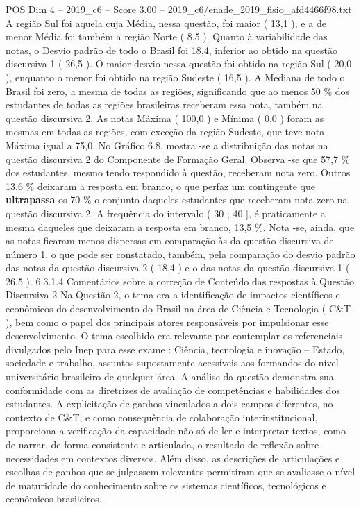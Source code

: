 \begin{textsample}{POS Dim 4 – 2019\_c6 – Score 3.00 – 2019\_c6/enade\_2019\_fisio\_afd4466f98.txt}
A região Sul foi aquela cuja Média, nessa questão, foi maior ( 13,1 ), e a de menor Média foi também a região Norte ( 8,5 ).
Quanto à variabilidade das notas, o Desvio padrão de todo o Brasil foi 18,4, inferior ao obtido na questão discursiva 1 ( 26,5 ).
O maior desvio nessa questão foi obtido na região Sul ( 20,0 ), enquanto o menor foi obtido na região Sudeste ( 16,5 ).
A Mediana de todo o Brasil foi zero, a mesma de todas as regiões, significando que ao menos 50 \% dos estudantes de todas as regiões brasileiras receberam essa nota, também na questão discursiva 2.
As notas Máxima ( 100,0 ) e Mínima ( 0,0 ) foram as mesmas em todas as regiões, com exceção da região Sudeste, que teve nota Máxima igual a 75,0.
No Gráfico 6.8, mostra -se a distribuição das notas na questão discursiva 2 do Componente de Formação Geral.
Observa -se que 57,7 \% dos estudantes, mesmo tendo respondido à questão, receberam nota zero.
Outros 13,6 \% deixaram a resposta em branco, o que perfaz um contingente que \textbf{ultrapassa} os 70 \% o conjunto daqueles estudantes que receberam nota zero na questão discursiva 2.
A frequência do intervalo ( 30 ; 40 ], é praticamente a mesma daqueles que deixaram a resposta em branco, 13,5 \%.
Nota -se, ainda, que as notas ficaram menos dispersas em comparação às da questão discursiva de número 1, o que pode ser constatado, também, pela comparação do desvio padrão das notas da questão discursiva 2 ( 18,4 ) e o das notas da questão discursiva 1 ( 26,5 ). 6.3.1.4 Comentários sobre a correção de Conteúdo das respostas à Questão Discursiva 2 Na Questão 2, o tema era a identificação de impactos científicos e econômicos do desenvolvimento do Brasil na área de Ciência e Tecnologia ( C\&T ), bem como o papel dos principais atores responsáveis por impulsionar esse desenvolvimento.
O tema escolhido era relevante por contemplar os referenciais divulgados pelo Inep para esse exame : Ciência, tecnologia e inovação – Estado, sociedade e trabalho, assuntos supostamente acessíveis aos formandos do nível universitário brasileiro de qualquer área.
A análise da questão demonstra sua conformidade com as diretrizes de avaliação de competências e habilidades dos estudantes.
A explicitação de ganhos vinculados a dois campos diferentes, no contexto de C\&T, e como consequência de colaboração interinstitucional, proporciona a verificação da capacidade não só de ler e interpretar textos, como de narrar, de forma consistente e articulada, o resultado de reflexão sobre necessidades em contextos diversos.
Além disso, as descrições de articulações e escolhas de ganhos que se julgassem relevantes permitiram que se avaliasse o nível de maturidade do conhecimento sobre os sistemas científicos, tecnológicos e econômicos brasileiros.

\end{textsample}
